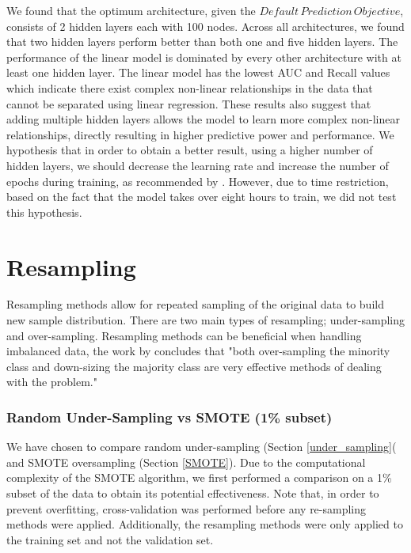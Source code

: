         
        We found that the optimum architecture, given the $Default \, Prediction \, Objective$, consists of 2 hidden layers each with 100 nodes. Across all architectures, we found that two hidden layers perform better than both one and five hidden layers. The performance of the linear model is dominated by every other architecture with at least one hidden layer. The linear model has the lowest AUC and Recall values which indicate there exist complex non-linear relationships in the data that cannot be separated using linear regression. These results also suggest that adding multiple hidden layers allows the model to learn more complex non-linear relationships, directly resulting in higher predictive power and performance. We hypothesis that in order to obtain a better result, using a higher number of hidden layers, we should decrease the learning rate and increase the number of epochs during training, as recommended by \cite{shallow_vs_deep}. However, due to time restriction, based on the fact that the model takes over eight hours to train, we did not test this hypothesis. 
        
        

    
    \section{Resampling}
        Resampling methods allow for repeated sampling of the original data to build new sample distribution. There are two main types of resampling; under-sampling and over-sampling. Resampling methods can be beneficial when handling imbalanced data, the work by \cite{imbalance_methods_3} concludes that "both over-sampling the minority class and down-sizing the majority class are very effective methods of dealing with the problem."
        
        \subsubsection{Random Under-Sampling vs SMOTE (1\% subset)} \label{SMOTE_exp}

        We have chosen to compare random under-sampling (Section \ref{under_sampling}( and SMOTE oversampling (Section \ref{SMOTE}). Due to the computational complexity of the SMOTE algorithm, we first performed a comparison on a 1\% subset of the data to obtain its potential effectiveness. Note that, in order to prevent overfitting, cross-validation was performed before any re-sampling methods were applied. Additionally, the resampling methods were only applied to the training set and not the validation set.
        
